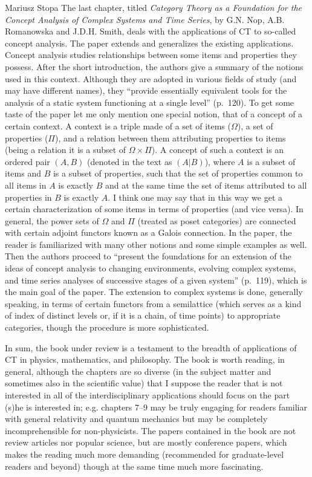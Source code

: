 \begin{recengenv}{Mariusz Stopa}
\enlargethispage{-.5\baselineskip}
The last chapter, titled \textit{Category Theory as a Foundation for the Concept Analysis of Complex Systems and Time Series}, by G.N. Nop, A.B. Romanowska and J.D.H. Smith, deals with the applications of CT to so-called concept analysis. The paper extends and generalizes the existing applications. Concept analysis studies relationships between some items and properties they possess. After the short introduction, the authors give a summary of the notions used in this context. Although they are adopted in various fields of study (and may have different names), they ``provide essentially equivalent tools for the analysis of a static system functioning at a single level'' (p.~120). To get some taste of the paper let me only mention one special notion, that of a concept of a certain context. A context is a triple made of a set of items ($ \Omega $), a set of properties ($ \Pi $), and a relation between them attributing properties to items (being a relation it is a subset of $ \Omega\times\Pi $). A concept of such a context is an ordered pair $ (A, B) $ (denoted in the text as $ (A|B) $), where $ A $ is a subset of items and $ B $ is a subset of properties, such that the set of properties common to all items in $ A $ is exactly $ B $ and at the same time the set of items attributed to all properties in $ B $ is exactly $ A $. I think one may say that in this way we get a certain characterization of some items in terms of properties (and vice versa). In general, the power sets of $ \Omega $ and $ \Pi $ (treated as poset cat\-e\-gories) are connected with certain adjoint functors known as a Galois connection. In the paper, the reader is familiarized with many other notions and some simple examples as well. Then the authors proceed to ``present the foundations for an extension of the ideas of concept analysis to changing environments, evolving complex systems, and time series analyses of successive stages of a given system'' (p.~119), which is the main goal of the paper. The extension to complex systems is done, generally speaking, in terms of certain functors from a semilattice (which serves as a kind of index of distinct levels or, if it is a chain, of time points) to appropriate cat\-e\-gories, though the procedure is more sophisticated.

In sum, the book under review is a testament to the breadth of applications of CT in physics, mathematics, and philosophy. The book is worth reading, in general, although the chapters are so diverse (in the subject matter and sometimes also in the scientific value) that I suppose the reader that is not interested in all of the interdisciplinary applications should focus on the part (s)he is interested in; e.g. chapters 7--9 may be truly engaging for readers familiar with general relativity and quantum mechanics but may be completely incomprehensible for non-physicists. The papers contained in the book are not review articles nor popular science, but are mostly conference papers, which makes the reading much more demanding (recommended for graduate-level readers and beyond) though at the same time much more fascinating.


\end{recengenv}
